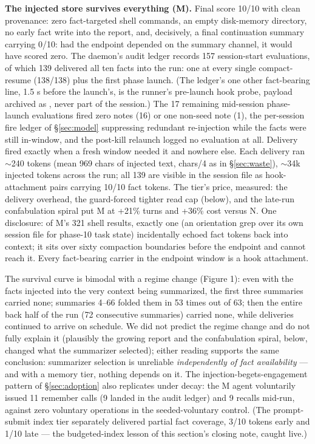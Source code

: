 \documentclass[11pt]{article}
\begin{document}
\textbf{The injected store survives everything (M).} Final score 10/10 with
clean provenance: zero fact-targeted shell commands, an empty
disk-memory directory, no early fact write into the report, and,
decisively, a final continuation summary carrying 0/10: had the
endpoint depended on the summary channel, it would have scored zero.
The daemon's audit ledger records 157 session-start evaluations, of
which 139 delivered all ten facts into the run: one at every single
compact-resume (138/138) plus the first phase launch. (The ledger's
one other fact-bearing line, 1.5 s before the launch's, is the
runner's pre-launch hook probe, payload archived as
, never part of the session.) The 17
remaining mid-session phase-launch evaluations fired zero notes (16)
or one non-seed note (1), the per-session fire ledger of \S\ref{sec:model}
suppressing redundant re-injection while the facts were still
in-window, and the post-kill relaunch logged no evaluation at all. Delivery fired exactly when a
fresh window needed it and nowhere else. Each delivery ran $\sim$240
tokens (mean 969 chars of injected text, chars/4 as in \S\ref{sec:waste}), $\sim$34k
injected tokens across the run; all 139 are visible in the session file as
hook-attachment pairs carrying 10/10 fact tokens. The tier's price,
measured: the delivery overhead, the guard-forced tighter read cap
(below), and the late-run confabulation spiral put M at +21\% turns
and +36\% cost versus N. One disclosure: of
M's 321 shell results, exactly one (an orientation grep over its own
session file for phase-10 task state) incidentally echoed fact tokens
back into context; it sits over sixty compaction boundaries before the
endpoint and cannot reach it. Every fact-bearing carrier in the
endpoint window is a hook attachment.

The survival curve is bimodal with a regime change (Figure 1): even
with the facts injected into the very context being summarized, the
first three summaries carried none; summaries 4--66 folded them in 53
times out of 63; then the entire back half of the run (72 consecutive
summaries) carried none, while deliveries continued to arrive on
schedule. We did not predict the regime change and do not fully
explain it (plausibly the growing report and the confabulation spiral,
below, changed what the summarizer selected); either reading supports
the same conclusion: summarizer selection is unreliable \emph{independently
of fact availability} --- and with a memory tier, nothing depends on it.
The injection-begets-engagement pattern of \S\ref{sec:adoption} also replicates under
decay: the M agent voluntarily issued 11 remember calls (9 landed in
the audit ledger) and 9 recalls mid-run, against zero voluntary
operations in the seeded-voluntary control. (The prompt-submit index tier separately delivered partial
fact coverage, 3/10 tokens early and 1/10 late --- the budgeted-index
lesson of this section's closing note, caught live.)
\end{document}
